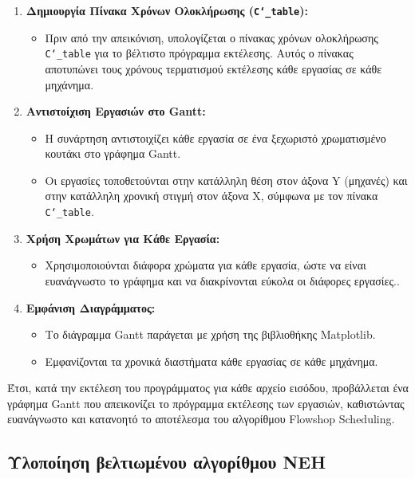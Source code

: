 \documentclass[paper=a4, fontsize=11pt]{scrartcl}
\numberwithin{equation}{section}		%
\numberwithin{figure}{section}			%
\numberwithin{table}{section}				%
\begin{document}
\begin{enumerate}
   \item \textbf{Δημιουργία Πίνακα Χρόνων Ολοκλήρωσης (\texttt{C\char`_table}):}
   \begin{itemize}
     \item Πριν από την απεικόνιση, υπολογίζεται ο πίνακας χρόνων ολοκλήρωσης \texttt{C\char`_table} για το βέλτιστο πρόγραμμα εκτέλεσης. Αυτός ο πίνακας αποτυπώνει τους χρόνους τερματισμού εκτέλεσης κάθε εργασίας σε κάθε μηχάνημα.
   \end{itemize}
   \item \textbf{Αντιστοίχιση Εργασιών στο Gantt:}
   \begin{itemize}
     \item Η συνάρτηση αντιστοιχίζει κάθε εργασία σε ένα ξεχωριστό χρωματισμένο κουτάκι στο γράφημα Gantt.
     \item Οι εργασίες τοποθετούνται στην κατάλληλη θέση στον άξονα Y (μηχανές) και στην κατάλληλη χρονική στιγμή στον άξονα X, σύμφωνα με τον πίνακα \texttt{C\char`_table}.
   \end{itemize}
   \item \textbf{Χρήση Χρωμάτων για Κάθε Εργασία:}
   \begin{itemize}
     \item Χρησιμοποιούνται διάφορα χρώματα για κάθε εργασία, ώστε να είναι ευανάγνωστο το γράφημα και να διακρίνονται εύκολα οι διάφορες εργασίες..
   \end{itemize}
   \item \textbf{Εμφάνιση Διαγράμματος:}
   \begin{itemize}
     \item Το διάγραμμα Gantt παράγεται με χρήση της βιβλιοθήκης Matplotlib.
     \item Εμφανίζονται τα χρονικά διαστήματα κάθε εργασίας σε κάθε μηχάνημα.
   \end{itemize}
\end{enumerate}

    Έτσι, κατά την εκτέλεση του προγράμματος για κάθε αρχείο εισόδου, προβάλλεται ένα γράφημα Gantt που απεικονίζει το πρόγραμμα εκτέλεσης των εργασιών, καθιστώντας ευανάγνωστο και κατανοητό το αποτέλεσμα του αλγορίθμου Flowshop Scheduling.

\newpage
\subsection{Υλοποίηση βελτιωμένου αλγορίθμου NEH}
\end{document}
